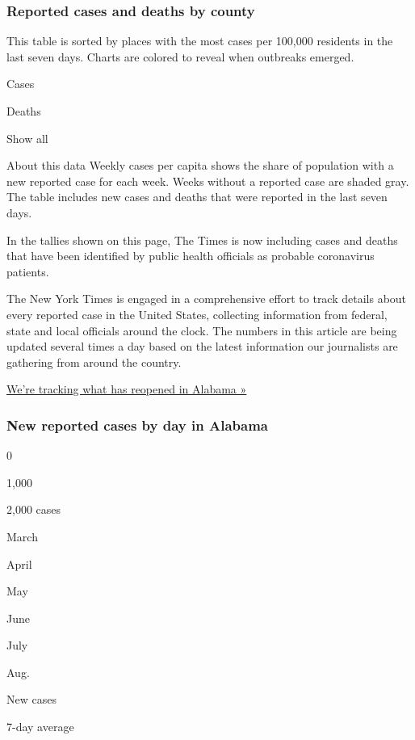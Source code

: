 \hypertarget{reported-cases-and-deaths-by-county}{%
\subsubsection{Reported cases and deaths by
county}\label{reported-cases-and-deaths-by-county}}

This table is sorted by places with the most cases per 100,000 residents
in the last seven days. Charts are colored to reveal when outbreaks
emerged.

Cases

Deaths

Show all

About this data Weekly cases per capita shows the share of population
with a new reported case for each week. Weeks without a reported case
are shaded gray. The table includes new cases and deaths that were
reported in the last seven days.

In the tallies shown on this page, The Times is now including cases and
deaths that have been identified by public health officials as probable
coronavirus patients.

The New York Times is engaged in a comprehensive effort to track details
about every reported case in the United States, collecting information
from federal, state and local officials around the clock. The numbers in
this article are being updated several times a day based on the latest
information our journalists are gathering from around the country.

\href{https://www.nytimes.com/interactive/2020/us/states-reopen-map-coronavirus.html}{We're
tracking what has reopened in Alabama »}

\hypertarget{new-reported-cases-by-day-in-alabama}{%
\subsubsection{New reported cases by day in
Alabama}\label{new-reported-cases-by-day-in-alabama}}

0

1,000

2,000 cases

March

April

May

June

July

Aug.

New cases

7-day average

